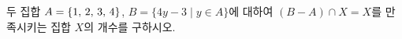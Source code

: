 두 집합 $A=\{1,\mkern3mu 2,\mkern3mu 3,\mkern3mu 4\}$, $B=\{4y-3 \mid y\in A\}$에 대하여 $(B-A)\cap X=X$를 만족시키는 집합 $X$의 개수를 구하시오.
